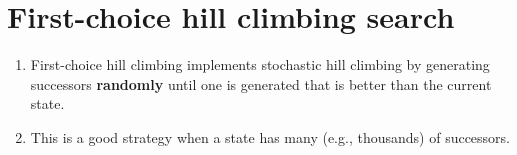 \section{First-choice hill climbing search \cite{ai/book/Artificial-Intelligence-A-Modern-Approach/Russell-Norvig}}
\label{AI: Algorithms/First-choice hill climbing search}

\begin{enumerate}
    \item First-choice hill climbing implements stochastic hill climbing by generating successors \textbf{randomly} until one is generated that is better than the current state.
    \hfill \cite{ai/book/Artificial-Intelligence-A-Modern-Approach/Russell-Norvig}

    \item This is a good strategy when a state has many (e.g., thousands) of successors.
    \hfill \cite{ai/book/Artificial-Intelligence-A-Modern-Approach/Russell-Norvig}
\end{enumerate}














